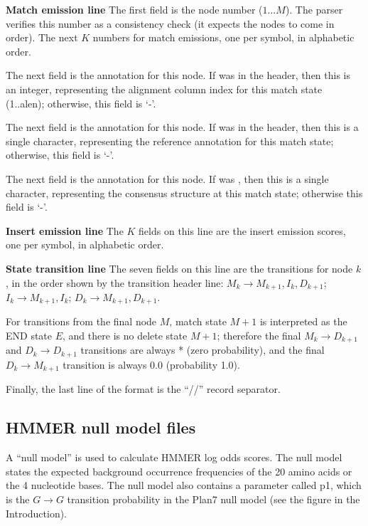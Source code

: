 \begin{wideitem}

\item [\textbf{Match emission line}] The first field is the node
number ($1 \ldots M$).  The parser verifies this number as a
consistency check (it expects the nodes to come in order). The next
$K$ numbers for match emissions, one per symbol, in alphabetic order.

The next field is the  annotation for this node.  If
 was  in the header, then this is an integer,
representing the alignment column index for this match state
(1..alen); otherwise, this field is `-'.

The next field is the  annotation for this node.  If
 was  in the header, then this is a single
character, representing the reference annotation for this match state;
otherwise, this field is `-'.

The next field is the  annotation for this node.  If
 was , then this is a single character,
representing the consensus structure at this match state; otherwise
this field is `-'.

\item [\textbf{Insert emission line}] The $K$ fields on this line are
the insert emission scores, one per symbol, in alphabetic order.

\item [\textbf{State transition line}] The seven fields on this line
are the transitions for node $k$, in the order shown by the transition
header line: $M_k \rightarrow M_{k+1}, I_{k}, D_{k+1}$; $ I_k
\rightarrow M_{k+1}, I_k$; $D_{k} \rightarrow M_{k+1}, D_{k+1}$.

For transitions from the final node $M$, match state $M+1$ is
interpreted as the END state $E$, and there is no delete state $M+1$;
therefore the final $M_k \rightarrow D_{k+1}$ and $D_k \rightarrow
D_{k+1}$ transitions are always * (zero probability), and the final
$D_k \rightarrow M_{k+1}$ transition is always 0.0 (probability 1.0).
\end{wideitem}

Finally, the last line of the format is the ``//'' record separator.


\subsection{HMMER null model files}

A ``null model'' is used to calculate HMMER log odds scores. The null
model states the expected background occurrence frequencies of the 20
amino acids or the 4 nucleotide bases. The null model also contains a
parameter called p1, which is the $G \rightarrow G$ transition
probability in the Plan7 null model (see the figure in the
Introduction).

